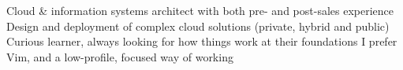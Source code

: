 
\begin{cvparagraph}

Cloud \& information systems architect with both pre- and post-sales experience\newline
Design and deployment of complex cloud solutions (private, hybrid and public)\newline
Curious learner, always looking for how things work at their foundations \newline
I prefer Vim, and a low-profile, focused way of working
\end{cvparagraph}
